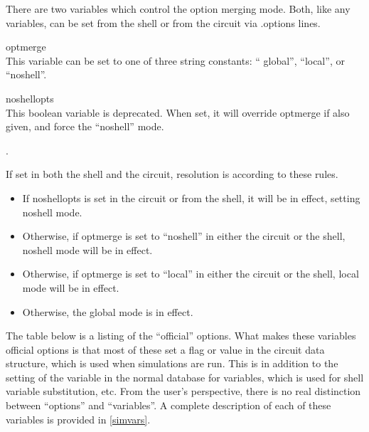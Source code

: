 There are two variables which control the option merging mode.  Both,
like any variables, can be set from the shell or from the circuit via
{\vt .options} lines.

\begin{description}
\item{\vt optmerge}\\
This variable can be set to one of three string constants:  ``{\vt
global}'', ``{\vt local}'', or ``{\vt noshell}''.

\item{\vt noshellopts}\\
This boolean variable is deprecated.  When set, it will override {\vt
optmerge} if also given, and force the ``{\vt noshell}'' mode.
\end{description}.

If set in both the shell and the circuit, resolution is according
to these rules.

\begin{itemize}
\item{If {\vt noshellopts} is set in the circuit or from the
shell, it will be in effect, setting {\vt noshell} mode.}

\item{Otherwise, if {\vt optmerge} is set to ``{\vt noshell}'' in
either the circuit or the shell, {\vt noshell} mode will be in effect.}

\item{Otherwise, if {\vt optmerge} is set to ``{\vt local}'' in either
the circuit or the shell, {\vt local} mode will be in effect.}

\item{Otherwise, the {\vt global} mode is in effect.}
\end{itemize}

The table below is a listing of the ``official'' options.  What makes
these variables official options is that most of these set a flag or
value in the circuit data structure, which is used when simulations
are run.  This is in addition to the setting of the variable in the
normal database for variables, which is used for shell variable
substitution, etc.  From the user's perspective, there is no real
distinction between ``options'' and ``variables''.  A complete
description of each of these variables is provided in \ref{simvars}.

